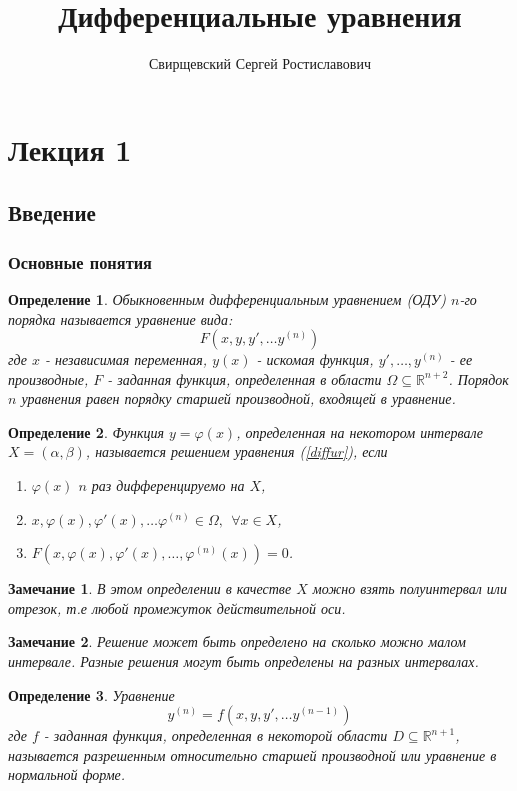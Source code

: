 \documentclass{article}
\author{Свирщевский Сергей Ростиславович}
\title{Дифференциальные уравнения}
\newtheorem*{df}{Определение}
\newtheorem*{ntc}{Замечание}
\begin{document}
  \maketitle
  \section*{Лекция 1}
  \subsection*{Введение}
  \subsubsection*{Основные понятия}
  \begin{df}
  Обыкновенным дифференциальным уравнением {(ОДУ)} $n$-го порядка называется уравнение вида:
  \begin{equation}
  \label{diffur}
  F(x, y, y', \ldots y^{(n)})
  \end{equation}
  где $x$ - независимая переменная, $y(x)$ - искомая функция, $ y', \ldots, y^{(n)} $ - ее производные, $F$ - заданная функция, определенная в области $\Omega \subseteq \mathbb{R}^{n+2}$. Порядок $n$ уравнения равен порядку старшей производной, входящей в уравнение. 
  \end{df}
  
  \begin{df}
  Функция $y = \varphi(x)$, определенная на некотором интервале $X = (\alpha, \beta)$, называется решением уравнения (\ref{diffur}), если 
  \begin{enumerate}
  \item $\varphi(x)$ $n$ раз дифференцируемо на $X$,
  \item $x, \varphi(x), \varphi'(x), \ldots \varphi^{(n)} \in \Omega,~~ \forall x \in X$,
  \item $F(x, \varphi(x), \varphi'(x), \ldots, \varphi^{(n)}(x)) = 0$.
  \end{enumerate}
  \end{df}
  \begin{ntc}
  В этом определении в качестве $X$ можно взять полуинтервал или отрезок, т.е любой промежуток действительной оси.
  \end{ntc}
  \begin{ntc}
  Решение может быть определено на сколько можно малом интервале. Разные решения могут быть определены на разных интервалах.
  \end{ntc}
  
  \begin{df}
  Уравнение 
  \begin{equation}
  \label{normaldiffur}
  y^{(n)} = f(x, y, y', \ldots y^{(n-1)})
  \end{equation}
  где $f$ - заданная функция, определенная в некоторой области $D \subseteq \mathbb{R}^{n+1}$, называется разрешенным относительно старшей производной или уравнение в нормальной форме.
  \end{df}
  
\end{document}
